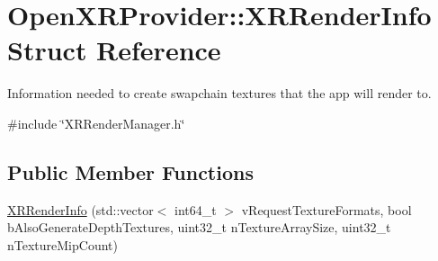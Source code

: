 \hypertarget{struct_open_x_r_provider_1_1_x_r_render_info}{}\section{Open\+X\+R\+Provider\+::X\+R\+Render\+Info Struct Reference}
\label{struct_open_x_r_provider_1_1_x_r_render_info}


Information needed to create swapchain textures that the app will render to.  




{\ttfamily \#include \char`\"{}X\+R\+Render\+Manager.\+h\char`\"{}}

\subsection*{Public Member Functions}
\begin{DoxyCompactItemize}
\item 
\mbox{\hyperlink{struct_open_x_r_provider_1_1_x_r_render_info_a4460ca9f1812222d5e10897d92dfca5b}{X\+R\+Render\+Info}} (std\+::vector$<$ int64\+\_\+t $>$ v\+Request\+Texture\+Formats, bool b\+Also\+Generate\+Depth\+Textures, uint32\+\_\+t n\+Texture\+Array\+Size, uint32\+\_\+t n\+Texture\+Mip\+Count)
\end{DoxyCompactItemize}
